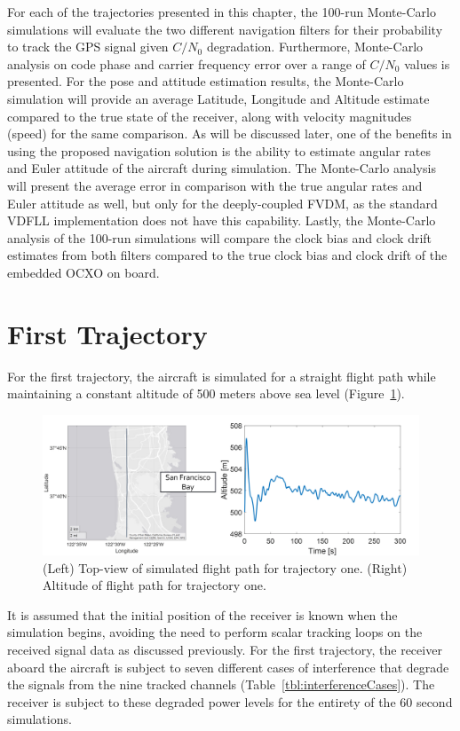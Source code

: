 For each of the trajectories presented in this chapter, the 100-run Monte-Carlo simulations will evaluate the two different navigation filters for their probability to track the GPS signal given \(C/N_0\) degradation. Furthermore, Monte-Carlo analysis on code phase and carrier frequency error over a range of \(C/N_0\) values is presented. For the pose and attitude estimation results, the Monte-Carlo simulation will provide an average Latitude, Longitude and Altitude estimate compared to the true state of the receiver, along with velocity magnitudes (speed) for the same comparison. As will be discussed later, one of the benefits in using the proposed navigation solution is the ability to estimate angular rates and Euler attitude of the aircraft during simulation. The Monte-Carlo analysis will present the average error in comparison with the true angular rates and Euler attitude as well, but only for the deeply-coupled FVDM, as the standard VDFLL implementation does not have this capability. Lastly, the Monte-Carlo analysis of the 100-run simulations will compare the clock bias and clock drift estimates from both filters compared to the true clock bias and clock drift of the embedded OCXO on board.


\section{\textbf{First Trajectory}}
For the first trajectory, the aircraft is simulated for a straight flight path while maintaining a constant altitude of 500 meters above sea level (Figure~\ref{fig:trajectory1}).

\begin{figure}[!ht]
    \centering
    \includegraphics[width=0.9\linewidth]{Figures/Results/trajectory1.png}
    \caption{(Left) Top-view of simulated flight path for trajectory one. (Right) Altitude of flight path for trajectory one.}\label{fig:trajectory1}
\end{figure}

It is assumed that the initial position of the receiver is known when the simulation begins, avoiding the need to perform scalar tracking loops on the received signal data as discussed previously. For the first trajectory, the receiver aboard the aircraft is subject to seven different cases of interference that degrade the signals from the nine tracked channels (Table~\ref{tbl:interferenceCases}). The receiver is subject to these degraded power levels for the entirety of the 60 second simulations.

